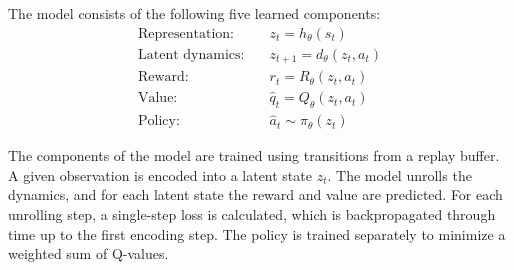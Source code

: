 \documentclass{article}
\begin{document}
The model consists of the following five learned components:
\begin{align}
\text{Representation:}  \quad &z_t = h_\theta(s_t) \\
\text{Latent dynamics:}  \quad &z_{t+1} = d_\theta(z_t, a_t) \\
\text{Reward:}  \quad &r_t = R_\theta(z_t, a_t) \\
\text{Value:}  \quad &\hat{q}_t = Q_\theta(z_t, a_t) \\
\text{Policy:} \quad &\hat{a}_t \sim \pi_\theta(z_t)
\end{align}

The components of the model are trained using transitions from a replay buffer.  
A given observation is encoded into a latent state $z_t$.  
The model unrolls the dynamics, and for each latent state the reward and value are predicted. For each unrolling step, a single-step loss is calculated, which is backpropagated through time up to the first encoding step.  
The policy is trained separately to minimize a weighted sum of Q-values.
\end{document}
